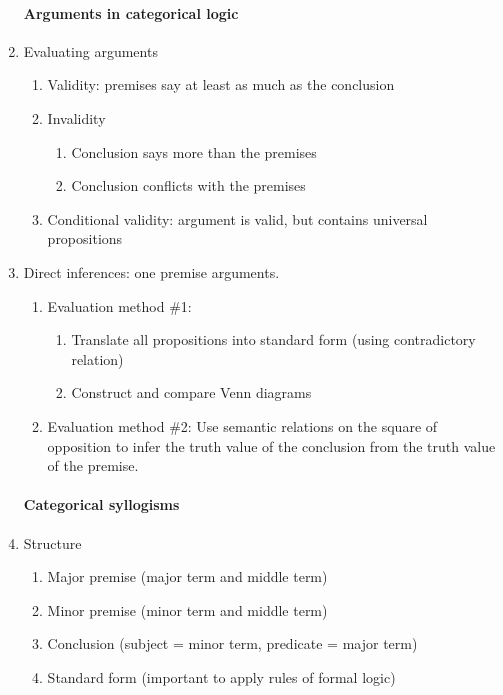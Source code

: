 \documentclass[10pt,landscape]{article}
\begin{document}
\begin{multicols}{2}
\begin{enumerate}
\paragraph{Arguments in categorical logic}
    \item Evaluating arguments
    \begin{enumerate}
    \item Validity: premises say at least as much as the conclusion
    \item Invalidity
      \begin{enumerate}
       \item Conclusion says more than the premises
       \item Conclusion conflicts with the premises
      \end{enumerate}
    \item Conditional validity: argument is valid, but contains universal propositions
    \end{enumerate}
    \item Direct inferences: one premise arguments.
      \begin{enumerate}
       \item Evaluation method \#1:
	\begin{enumerate}
	 \item Translate all propositions into standard form (using contradictory relation)
	 \item Construct and compare Venn diagrams
	\end{enumerate}
      \item Evaluation method \#2: Use semantic relations on the square of opposition to infer the truth value of the conclusion from the truth value of the premise.
      \end{enumerate}
      
\paragraph{Categorical syllogisms}
    \item Structure
      \begin{enumerate}
       \item Major premise (major term and middle term)
       \item Minor premise (minor term and middle term)
       \item Conclusion (subject = minor term, predicate = major term)
       \item Standard form (important to apply rules of formal logic)
      \end{enumerate}


\end{enumerate}
\end{multicols}
\end{document}
